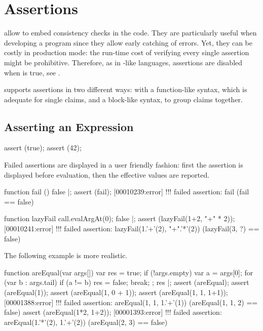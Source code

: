 \section{Assertions}
\label{sec:lang:assert}

 allow to embed consistency checks in the code.
They are particularly useful when developing a program since they allow
early catching of errors.  Yet, they can be costly in production mode: the
run-time cost of verifying every single assertion might be prohibitive.
Therefore, as in \C-like languages, assertions are disabled when
 is true, see .

\us supports assertions in two different ways: with a function-like
syntax, which is adequate for single claims, and a block-like syntax,
to group claims together.

\subsection{Asserting an Expression}

\begin{urbiscript}
assert (true);
assert (42);
\end{urbiscript}

Failed assertions are displayed in a user friendly fashion: first the
assertion is displayed before evaluation, then the effective values are
reported.

\begin{urbiscript}
function fail () { false }|;
assert (fail);
[00010239:error] !!! failed assertion: fail (fail == false)

function lazyFail { call.evalArgAt(0); false }|;
assert (lazyFail(1+2, "+" * 2));
[00010241:error] !!! failed assertion: lazyFail(1.'+'(2), "+".'*'(2)) (lazyFail(3, ?) == false)
\end{urbiscript}

The following example is more realistic.

\begin{urbiscript}
function areEqual(var args[])
{
  var res = true;
  if (!args.empty)
  {
    var a = args[0];
    for (var b : args.tail)
      if (a != b)
      {
        res = false;
        break;
      }
  };
  res
}|;
assert (areEqual);
assert (areEqual(1));
assert (areEqual(1, 0 + 1));
assert (areEqual(1, 1, 1+1));
[00001388:error] !!! failed assertion: areEqual(1, 1, 1.'+'(1)) (areEqual(1, 1, 2) == false)
assert (areEqual(1*2, 1+2));
[00001393:error] !!! failed assertion: areEqual(1.'*'(2), 1.'+'(2)) (areEqual(2, 3) == false)
\end{urbiscript}

